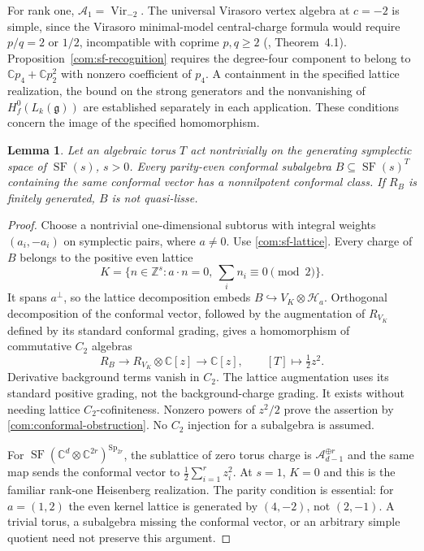 \documentclass[11pt,a4paper]{amsart}
\numberwithin{equation}{section}
\newtheorem{lemma}[theorem]{Lemma}
\theoremstyle{definition}
\theoremstyle{remark}
\newcommand{\C}{\mathbb C}
\newcommand{\Z}{\mathbb Z}
\newcommand{\g}{\mathfrak g}
\newcommand{\SF}{\operatorname{SF}}
\newcommand{\Sp}{\operatorname{Sp}}
\newcommand{\Vir}{\operatorname{Vir}}
\begin{document}
For rank one, $\mathcal A_1=\Vir_{-2}$. The universal Virasoro vertex algebra at
$c=-2$ is simple, since the Virasoro minimal-model central-charge formula would require
$p/q=2$ or $1/2$, incompatible with coprime $p,q\ge2$
(\cite{Salazar2026}, Theorem~4.1). Proposition~\ref{com:sf-recognition} requires the degree-four component
to belong to $\C p_4+\C p_2^2$ with nonzero coefficient of $p_4$. A containment in the specified lattice realization,
the bound on the strong generators and the nonvanishing of
$H_f^0(L_k(\g))$ are established separately in each application. These conditions concern the image of the specified homomorphism.


\begin{lemma}
\label{vtwo:torus-detector}
Let an algebraic torus $T$ act nontrivially on the generating symplectic
space of $\SF(s)$, $s>0$. Every parity-even conformal subalgebra
$B\subseteq\SF(s)^T$ containing the same conformal vector has a
nonnilpotent conformal class. If $R_B$ is finitely generated, $B$ is
not quasi-lisse.
\end{lemma}
\begin{proof}
Choose a nontrivial one-dimensional subtorus with integral weights
$(a_i,-a_i)$ on symplectic pairs, where $a\ne0$. Use
\eqref{com:sf-lattice}. Every charge of $B$ belongs to the positive
even lattice
$$
 K=\{n\in\Z^s:a\cdot n=0,\ \textstyle\sum_i n_i\equiv0\pmod2\}.
$$
It spans $a^\perp$, so the lattice decomposition embeds
$B\hookrightarrow V_K\otimes\mathcal H_a$. Orthogonal decomposition
of the conformal vector, followed by the augmentation of $R_{V_K}$ defined
by its standard conformal grading, gives a homomorphism of commutative $C_2$ algebras
$$
 R_B\longrightarrow R_{V_K}\otimes\C[z]\longrightarrow\C[z],
 \qquad [T]\longmapsto\tfrac12z^2.
$$
Derivative background terms vanish in $C_2$. The lattice augmentation
uses its standard positive grading, not the background-charge grading.
It exists without needing lattice $C_2$-cofiniteness. Nonzero powers of
$z^2/2$ prove the assertion by \cref{com:conformal-obstruction}.
No $C_2$ injection for a subalgebra is assumed.

For $\SF(\C^d\otimes\C^{2r})^{\Sp_{2r}}$, the sublattice of zero torus charge is
$\mathcal A_{d-1}^{\oplus r}$ and the same map sends the conformal vector to
$\frac12\sum_{i=1}^r z_i^2$. At $s=1$, $K=0$ and this is the familiar
rank-one Heisenberg realization. The parity condition is essential:
for $a=(1,2)$ the even kernel lattice is generated by $(4,-2)$, not
$(2,-1)$. A trivial torus, a subalgebra missing the conformal vector, or an
arbitrary simple quotient need not preserve this argument.
\end{proof}
\end{document}
